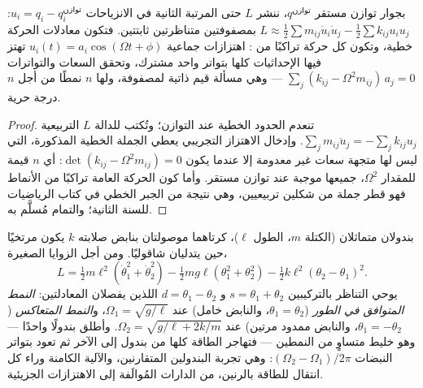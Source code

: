 \begin{proposition}\label{prop:b3:lagrangian-mechanics:modes}
بجوار توازن مستقر $q^{\text{توازن}}$، ننشر $L$ حتى المرتبة الثانية
في الانزياحات $u_i = q_i - q_i^{\text{توازن}}$:
$L \approx \tfrac12\sum m_{ij}\dot u_i\dot u_j -
\tfrac12\sum k_{ij}u_iu_j$ بمصفوفتين متناظرتين ثابتتين. فتكون
معادلات الحركة خطية، وتكون كل حركة تراكبًا من
\emph{}: اهتزازات جماعية $u_i(t) = a_i\cos(\Omega t
+ \phi)$ تهتز فيها الإحداثيات كلها بتواتر واحد مشترك، وتحقق
السعات والتواترات $\sum_j(k_{ij} -
\Omega^2m_{ij})\,a_j = 0$ --- وهي مسألة قيم ذاتية لمصفوفة، ولها $n$
نمطًا من أجل $n$ درجة حرية.
\end{proposition}

\begin{proof}
تنعدم الحدود الخطية عند التوازن؛ وتُكتب 
للدالة $L$ التربيعية $\sum_jm_{ij}\ddot u_j = -\sum_jk_{ij}u_j$.
وإدخال الاهتزاز التجريبي يعطي الجملة الخطية المذكورة، التي ليس
لها متجهة سعات غير معدومة إلا عندما يكون $\det(k_{ij} -
\Omega^2m_{ij}) = 0$: أي $n$ قيمة للمقدار $\Omega^2$، جميعها موجبة
عند توازن مستقر. وأما كون الحركة العامة تراكبًا من الأنماط فهو
قطر جملة من شكلين تربيعيين، وهي نتيجة من الجبر الخطي في كتاب
الرياضيات للسنة الثانية؛ والتمام مُسلَّم به.
\end{proof}

\begin{example}\label{ex:b3:lagrangian-mechanics:coupled}
بندولان متماثلان (الكتلة $m$، الطول $\ell$)، كرتاهما موصولتان
بنابض صلابته $k$ يكون مرتخيًا حين يتدليان شاقوليًا. ومن أجل
الزوايا الصغيرة،
\[
L = \tfrac12 m\ell^2(\dot\theta_1^2 + \dot\theta_2^2)
 - \tfrac12 mg\ell(\theta_1^2 + \theta_2^2)
 - \tfrac12 k\ell^2(\theta_2 - \theta_1)^2 .
\]
يوحي التناظر بالتركيبين $s = \theta_1 + \theta_2$ و $d =
\theta_1 - \theta_2$ اللذين يفصلان المعادلتين: \emph{النمط المتوافق
في الطور} ($\theta_1 = \theta_2$، والنابض خامل) عند $\Omega_1 =
\sqrt{g/\ell}$، و\emph{النمط المتعاكس} ($\theta_1 = -\theta_2$،
والنابض ممدود مرتين) عند $\Omega_2 = \sqrt{g/\ell + 2k/m}$. وأطلق
بندولًا واحدًا --- وهو خليط متساوٍ من النمطين --- فتهاجر الطاقة
كلها من بندول إلى الآخر ثم تعود بتواتر النبضات
$(\Omega_2 - \Omega_1)/2\pi$: وهي تجربة البندولين المتقارنين،
والآلية الكامنة وراء كل انتقال للطاقة بالرنين، من الدارات
المُوالَفة إلى الاهتزازات الجزيئية.
\end{example}

